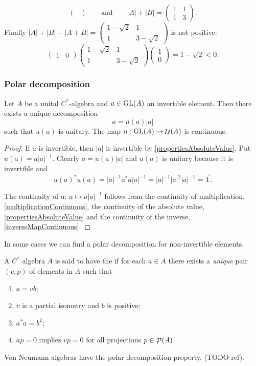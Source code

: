 \begin{example}
\[\begin{pmatrix}
\end{pmatrix} \qquad\text{and}\qquad |A| + |B| = \begin{pmatrix}
1 & 1 \\ 1 & 3
\end{pmatrix}. \]
Finally $|A| + |B| - |A+B| = \begin{pmatrix}
1 - \sqrt{2} & 1 \\ 1 & 3-\sqrt{2}
\end{pmatrix}$ is not positive:
\[ \begin{pmatrix}
1 & 0
\end{pmatrix}\begin{pmatrix}
1 - \sqrt{2} & 1 \\ 1 & 3-\sqrt{2}
\end{pmatrix}\begin{pmatrix}
1 \\ 0
\end{pmatrix} = 1-\sqrt{2} < 0. \]
\end{example}

\subsubsection{Polar decomposition}
\begin{proposition}
Let $A$ be a unital $C^*$-algebra and $a\in \operatorname{GL}(A)$ an invertible element. Then there exists a unique decomposition
\[ a = u(a) |a| \]
such that $u(a)$ is unitary. The map $u: \operatorname{GL}(A) \to \mathop{\mathcal{U}}\nolimits(A)$ is continuous.
\end{proposition}
\begin{proof}
If $a$ is invertible, then $|a|$ is invertible by \ref{propertiesAbsoluteValue}. Put $u(a) = a|a|^{-1}$. Clearly $a = u(a)|a|$ and $u(a)$ is unitary because it is invertible and
\[ u(a)^*u(a) = |a|^{-1}a^*a|a|^{-1} = |a|^{-1}|a|^2|a|^{-1} = \vec{1}. \]

The continuity of u: $a\mapsto a|a|^{-1}$ follows from the continuity of multiplication, \ref{multiplicationContinuous}, the continuity of the absolute value, \ref{propertiesAbsoluteValue} and the continuity of the inverse, \ref{inverseMapContinuous}.
\end{proof}

In some cases we can find a polar decomposition for non-invertible elements.
\begin{definition}
A $C^*$ algebra $A$ is said to have the  if for each $a\in A$ there exists a \emph{unique} pair $(v,p)$ of elements in $A$ such that
\begin{enumerate}
\item $a = vb$;
\item $v$ is a partial isometry and $b$ is positive;
\item $a^*a = b^2$;
\item $ap = 0$ implies $vp = 0$ for all projections $p\in\mathop{\mathcal{P}}\nolimits(A)$.
\end{enumerate}
\end{definition}
Von Neumann algebras have the polar decomposition property. (TODO ref).

